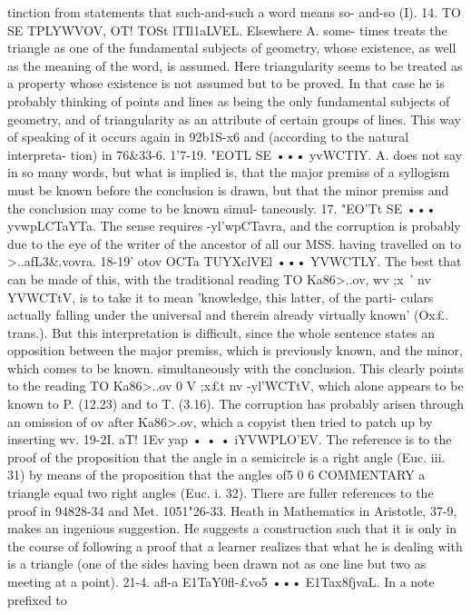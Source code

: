 {tinction from statements that such-and-such a word means so-
and-so (I).
14. TO SE TPLYWVOV, OT! TOSt lTIl\-1aLVEL. Elsewhere A. some-
times treats the triangle as one of the fundamental subjects of
geometry, whose existence, as well as the meaning of the word,
is assumed. Here triangularity seems to be treated as a property
whose existence is not assumed but to be proved. In that case
he is probably thinking of points and lines as being the only
fundamental subjects of geometry, and of triangularity as an
attribute of certain groups of lines. This way of speaking of it
occurs again in 92b1S-x6 and (according to the natural interpreta-
tion) in 76&33-6.
1'7-19. "EOTL SE ••• yvWCTIY. A. does not say in so many words,
but what is implied is, that the major premiss of a syllogism
must be known before the conclusion is drawn, but that the
minor premiss and the conclusion may come to be known simul-
taneously.
17. "EO'Tt SE ••• yvwpLCTaYTa. The sense requires -yl'wp{CTavra, and
the corruption is probably due to the eye of the writer of the
ancestor of all our MSS. having travelled on to >..afL{3&.vovra.
18-19' otov OCTa TUYXclVEl ••• YVWCTLY. The best that can be
made of this, with the traditional reading TO Ka86>..ov, wv ;x~' n}v
YVWCTtV, is to take it to mean 'knowledge, this latter, of the parti-
culars actually falling under the universal and therein already
virtually known' (Ox£. trans.). But this interpretation is difficult,
since the whole sentence states an opposition between the major
premiss, which is previously known, and the minor, which comes
to be known. simultaneously with the conclusion. This clearly
points to the reading TO Ka86>..ov 0 V ;x£t n}v -yl'WCTtV, which alone
appears to be known to P. (12.23) and to T. (3.16). The corruption
has probably arisen through an omission of ov after Ka86>.ov,
which a copyist then tried to patch up by inserting wv.
19-2I. aT! \-1Ev yap • • • iYVWPLO'EV. The reference is to the
proof of the proposition that the angle in a semicircle is a right
angle (Euc. iii. 31) by means of the proposition that the angles of5 0 6
COMMENTARY
a triangle equal two right angles (Euc. i. 32). There are fuller
references to the proof in 94828-34 and Met. 1051"26-33.
Heath in Mathematics in Aristotle, 37-9, makes an ingenious
suggestion. He suggests a construction such that it is only in the
course of following a proof that a learner realizes that what he
is dealing with is a triangle (one of the sides having been drawn
not as one line but two as meeting at a point).
21-4. afl-a E1TaY0fl-£vo5 ••• E1Tax8fjvaL. In a note prefixed to
}

